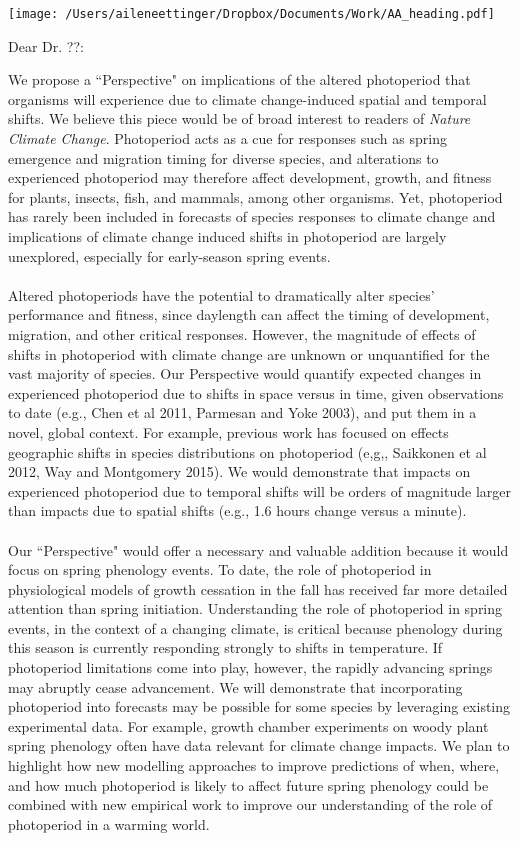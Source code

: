 \documentclass[11pt,a4paper]{letter}
\begin{document}

\begin{letter}{}
\texttt{[image: /Users/aileneettinger/Dropbox/Documents/Work/AA\_heading.pdf]}

\opening{Dear Dr. ??:}
We propose a ``Perspective" on implications of the altered photoperiod that organisms will experience due to climate change-induced spatial and temporal shifts. 
We believe this piece would be of broad interest to readers of \emph{Nature Climate Change}. Photoperiod acts as a cue for responses such as spring emergence and migration timing for diverse species, and alterations to experienced photoperiod may therefore affect development, growth, and fitness for plants, insects, fish, and mammals, among other organisms. Yet, photoperiod has rarely been included in forecasts of species responses to climate change and implications of climate change induced shifts in photoperiod are largely unexplored, especially for early-season spring events. 
\\
\\
Altered photoperiods have the potential to dramatically alter species' performance and fitness, since daylength can affect the timing of development, migration, and other critical responses.  However, the magnitude of effects of shifts in photoperiod with climate change are unknown or unquantified for the vast majority of species.  Our Perspective would quantify expected changes in experienced photoperiod due to shifts in space versus in time, given observations to date (e.g., Chen et al 2011, Parmesan and Yoke 2003), and put them in a novel, global context. For example, previous work has focused on effects geographic shifts in species distributions on photoperiod (e,g,, Saikkonen et al 2012, Way and Montgomery 2015). We would demonstrate that impacts on experienced photoperiod due to temporal shifts will be orders of magnitude larger than impacts due to spatial shifts (e.g., 1.6 hours change versus a minute). 
\\
\\
Our ``Perspective" would offer a necessary and valuable addition because it would focus on spring phenology events. To date, the role of photoperiod in physiological models of growth cessation in the fall has received far more detailed attention than spring initiation. Understanding the role of photoperiod in spring events, in the context of a changing climate, is critical because phenology during this season is currently responding strongly to shifts in temperature. If photoperiod limitations come into play, however, the rapidly advancing springs may abruptly cease advancement. We will demonstrate that incorporating photoperiod into forecasts may be possible for some species by leveraging existing experimental data. For example, growth chamber experiments on woody plant spring phenology often have data relevant for climate change impacts. We plan to highlight how new modelling approaches to improve predictions of when, where, and how much photoperiod is likely to affect future spring phenology could be combined with new empirical work to improve our understanding of the role of photoperiod in a warming world.

\end{letter}
\end{document}
